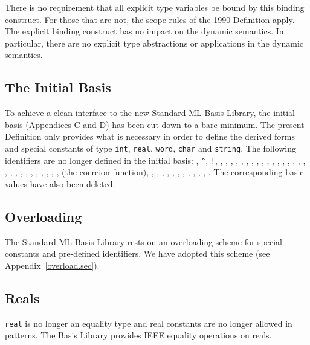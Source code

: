 There is no requirement that all explicit type variables be bound by
this binding construct. For those that are not, the scope rules of 
the 1990 Definition apply. The explicit binding construct
has no impact on the dynamic semantics. In particular,
there are no explicit type abstractions or applications in
the dynamic semantics.


\subsection{The Initial Basis}
To achieve a clean interface to the new Standard ML Basis Library\cite{mllib96},
the initial basis (Appendices C and D) has been cut down to a bare
minimum. The present Definition only provides what is necessary in order
to define the  derived forms
and special constants of type {\tt int}, {\tt real}, {\tt word},
{\tt char} and {\tt string}.  The following identifiers are no longer
defined in the initial basis:
\boxml{<>}, \verb+^+, \verb+!+, , , 
, , , ,
, , , ,
, , , 
,
, ,
, , , , ,
, , ,
, ,
, ,
 (the coercion function), , 
, , , , , , , 
, ,
, .
The corresponding basic values have also been deleted. 
\subsection{Overloading}
The Standard ML Basis Library\cite{mllib96}
rests on an overloading scheme for special constants and 
pre-defined identifiers. We have adopted this scheme 
(see Appendix~\ref{overload.sec}).
\subsection{Reals}
{\tt real} is no longer an equality type and real constants are no longer allowed 
in patterns. The Basis Library provides IEEE equality operations on reals.

%


